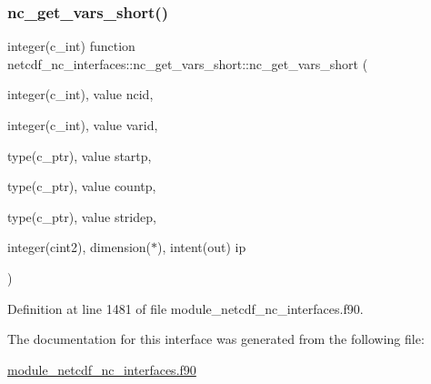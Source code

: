 \subsubsection{\texorpdfstring{nc\+\_\+get\+\_\+vars\+\_\+short()}{nc\_get\_vars\_short()}}
{\footnotesize\ttfamily integer(c\+\_\+int) function netcdf\+\_\+nc\+\_\+interfaces\+::nc\+\_\+get\+\_\+vars\+\_\+short\+::nc\+\_\+get\+\_\+vars\+\_\+short (\begin{DoxyParamCaption}\item[{integer(c\+\_\+int), value}]{ncid,  }\item[{integer(c\+\_\+int), value}]{varid,  }\item[{type(c\+\_\+ptr), value}]{startp,  }\item[{type(c\+\_\+ptr), value}]{countp,  }\item[{type(c\+\_\+ptr), value}]{stridep,  }\item[{integer(cint2), dimension($\ast$), intent(out)}]{ip }\end{DoxyParamCaption})}



Definition at line 1481 of file module\+\_\+netcdf\+\_\+nc\+\_\+interfaces.\+f90.



The documentation for this interface was generated from the following file\+:\begin{DoxyCompactItemize}
\item 
\hyperlink{module__netcdf__nc__interfaces_8f90}{module\+\_\+netcdf\+\_\+nc\+\_\+interfaces.\+f90}\end{DoxyCompactItemize}
